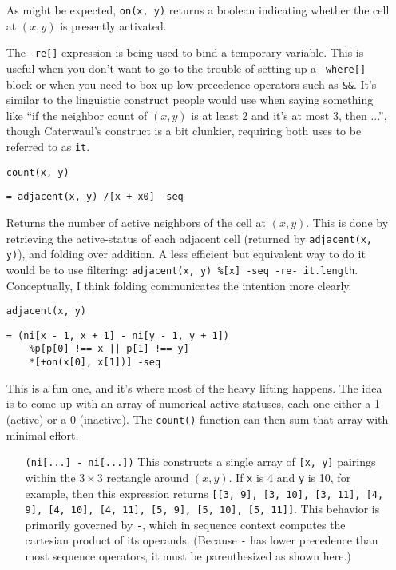 \documentclass{report}
\begin{document}
\begin{enumerate}
  As might be expected, {\tt on(x, y)} returns a boolean indicating whether the cell at $(x, y)$ is presently activated.

  The {\tt -re[]} expression is being used to bind a temporary variable. This is useful when you don't want to go to the trouble of setting up a {\tt -where[]} block or when you need
  to box up low-precedence operators such as {\tt \&\&}. It's similar to the linguistic construct people would use when saying something like ``if the neighbor count of $(x, y)$ is at
  least 2 and it's at most 3, then ...'', though Caterwaul's construct is a bit clunkier, requiring both uses to be referred to as {\tt it}.

\item[{\tt count(x, y)}]
\begin{verbatim}
= adjacent(x, y) /[x + x0] -seq
\end{verbatim}

  Returns the number of active neighbors of the cell at $(x, y)$. This is done by retrieving the active-status of each adjacent cell (returned by {\tt adjacent(x, y)}), and folding
  over addition. A less efficient but equivalent way to do it would be to use filtering: \verb|adjacent(x, y) %[x] -seq -re- it.length|. Conceptually, I think folding communicates the
  intention more clearly.

\item[{\tt adjacent(x, y)}]
\begin{verbatim}
= (ni[x - 1, x + 1] - ni[y - 1, y + 1])
    %p[p[0] !== x || p[1] !== y]
    *[+on(x[0], x[1])] -seq
\end{verbatim}

  This is a fun one, and it's where most of the heavy lifting happens. The idea is to come up with an array of numerical active-statuses, each one either a 1 (active) or a 0
  (inactive). The {\tt count()} function can then sum that array with minimal effort.

\begin{enumerate}
\item[{\tt (ni[...]~- ni[...])}]
  This constructs a single array of {\tt [x, y]} pairings within the $3\times 3$ rectangle around $(x, y)$. If {\tt x} is 4 and {\tt y} is 10, for example, then this expression
  returns {\tt [[3, 9], [3, 10], [3, 11], [4, 9], [4, 10], [4, 11], [5, 9], [5, 10], [5, 11]]}. This behavior is primarily governed by {\tt -}, which in sequence context computes
  the cartesian product of its operands. (Because {\tt -} has lower precedence than most sequence operators, it must be parenthesized as shown here.)


\end{enumerate}
\end{enumerate}
\end{document}

